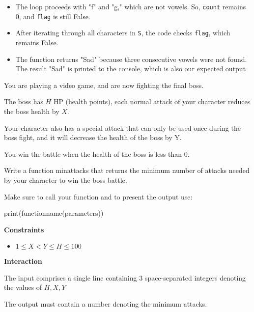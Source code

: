 \documentclass[a4paper]{exam}
\newcommand\heading[1]{\textbf{#1}}
\newcommand\alert[2]{\centerline{\textbf\large{\underline{\color{#1}{#2}}}}}
\begin{document}
\begin{questions}
\begin{enumerate}
\begin{itemize}
        \item The loop proceeds with "f" and "g," which are not vowels. So, \texttt{count} remains 0, and \texttt{flag} is still False.
        
        \item After iterating through all characters in \texttt{S}, the code checks \texttt{flag}, which remains False.
        
        \item The function returns "Sad" because three consecutive vowels were not found. The result "Sad" is printed to the console, which is also our expected output

    \end{itemize}
    
\end{enumerate}

\alert{Green} {This means the applied logic is correct}






    You are playing a video game, and are now fighting the final boss.

    The boss has $H$ HP (health points), each normal attack of your character reduces the boss health by $X$.

    Your character also has a special attack that can only be used once during the boss fight, and it will decrease the health of the boss by Y.

    You win the battle when the health of the boss is less than 0.

    Write a function minattacks that returns the minimum number of attacks needed by your character to win the boss battle.

    Make sure to call your function and to present the output use:

    print(functionname(parameters))

    \heading{Constraints}
    \begin{itemize}
        \item $ 1 \leq X < Y \leq H \leq 100 $

    \end{itemize}

    \heading{Interaction}

    The input comprises a single line containing 3 space-separated integers denoting the values of $H, X, Y$

    The output must contain a number denoting the minimum attacks.


\end{questions}
\end{document}
